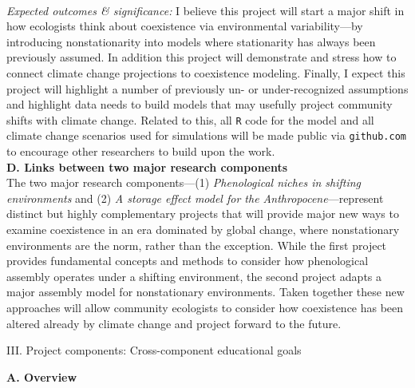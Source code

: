 \documentclass[12pt,a4paper,oneside]{article}
\begin{document}
\vspace{1.5ex}\\
\emph{Expected outcomes \& significance:}  I believe this project will start a major shift in how ecologists think about coexistence via environmental variability---by introducing nonstationarity into models where stationarity has always been previously assumed. In addition this project will demonstrate and stress how to connect climate change projections to coexistence modeling. Finally, I expect this project will highlight a number of previously un- or under-recognized assumptions and highlight data needs to build models that may usefully project community shifts with climate change. Related to this, all \verb|R| code for the model and all climate change scenarios used for simulations will be made public via \verb|github.com|  to encourage other researchers to build upon the work. %
\vspace{1.5ex}\\
{\bf D. Links between two major research components}
\vspace{1.5ex}\\
The two major research components---(1) \emph{Phenological niches in shifting environments} and (2) \emph{A storage effect model for the Anthropocene}---represent distinct but highly complementary projects that will provide major new ways to examine coexistence in an era dominated by global change, where nonstationary environments are the norm, rather than the exception. While the first project provides fundamental concepts and methods to consider how phenological assembly operates under a shifting environment, the second project adapts a major assembly model for nonstationary environments. Taken together these new approaches will allow community ecologists to consider how coexistence has been altered already by climate change and project forward to the future. \\
\begin{center}
{\sc III. Project components: Cross-component educational goals}
\vspace{0.5ex}\\
\end{center}
{\bf A. Overview}
\vspace{1.5ex}\\
\end{document}
